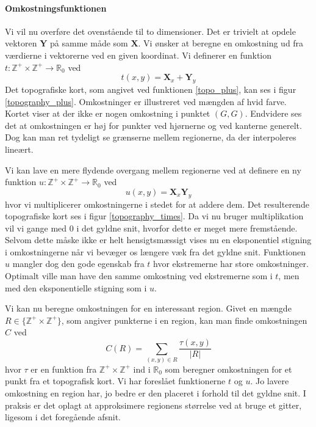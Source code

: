 {\paragraph{Omkostningsfunktionen}
Vi vil nu overføre det ovenstående til to dimensioner. Det er trivielt
at opdele vektoren $\mathbf{Y}$ på samme måde som $\mathbf{X}$. Vi
ønsker at beregne en omkostning ud fra værdierne i vektorerne ved en
given koordinat. Vi definerer en funktion $t :
\mathbb{Z}^{+} \times \mathbb{Z}^{+} \rightarrow \mathbb{R}_{0}$ ved
\begin{equation}
    t(x, y) = \mathbf{X}_x + \mathbf{Y}_y
    \label{topo_plus}
\end{equation}
Det topografiske kort, som angivet ved funktionen \ref{topo_plus}, kan
ses i figur \ref{topography_plus}. Omkostninger er illustreret ved
mængden af hvid farve. Kortet viser at der ikke er nogen omkostning i
punktet $(G, G)$. Endvidere ses det at omkostningen er høj for punkter
ved hjørnerne og ved kanterne generelt. Dog kan man ret tydeligt se
grænserne mellem regionerne, da der interpoleres lineært.

Vi kan lave en mere flydende overgang mellem regionerne ved at definere
en ny funktion $u : \mathbb{Z}^{+} \times \mathbb{Z}^{+} \rightarrow
\mathbb{R}_{0}$ ved
\begin{equation}
    u(x, y) = \mathbf{X}_x\mathbf{Y}_y
    \label{topo_multiply}
\end{equation}
hvor vi multiplicerer omkostningerne i stedet for at addere dem. Det
resulterende topografiske kort ses i figur \ref{topography_times}. Da vi
nu bruger multiplikation vil vi gange med $0$ i det gyldne snit, hvorfor
dette er meget mere fremstående. Selvom dette måske ikke er helt
hensigtsmæssigt vises nu en eksponentiel stigning i omkostningerne når
vi bevæger os længere væk fra det gyldne snit. Funktionen $u$ mangler
dog den gode egenskab fra $t$ hvor ekstremerne har store omkostninger.
Optimalt ville man have den samme omkostning ved ekstremerne som i
$t$, men med den eksponentielle stigning som i $u$.

Vi kan nu beregne omkostningen for en interessant region. Givet en
mængde $R \in \{\mathbb{Z}^{+}\times\mathbb{Z}^{+}\}$, som angiver
punkterne i en region, kan man finde omkostningen $C$ ved
\begin{equation}
    C(R) = \sum_{(x, y) \in R}{\frac{\tau(x, y)}{|R|}}
\end{equation}
hvor $\tau$ er en funktion fra $\mathbb{Z}^{+}\times\mathbb{Z}^{+}$ ind
i $\mathbb{R}_0$ som beregner omkostningen for et punkt fra et
topografisk kort. Vi har foreslået funktionerne $t$ og $u$. Jo lavere
omkostning en region har, jo bedre er den placeret i forhold til det
gyldne snit. I praksis er det oplagt at approksimere regionens
størrelse ved at bruge et gitter, ligesom i det foregående afsnit.


}
